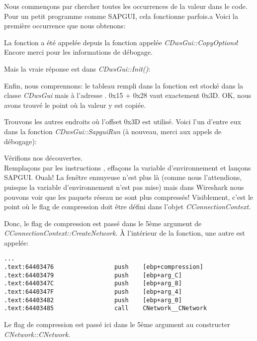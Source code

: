 Nous commençons par chercher toutes les occurrences de la valeur  dans le
code.
Pour un petit programme comme SAPGUI, cela fonctionne parfois.a Voici la première
occurrence que nous obtenons:



La fonction a été appelée depuis la fonction appelée \emph{CDwsGui::CopyOptions}!
Encore merci pour les informations de débogage.

Mais la vraie réponse est dans \emph{CDwsGui::Init()}:



Enfin, nous comprennons: le tableau rempli dans la fonction 
est stocké dans la classe \emph{CDwsGui} mais à l'adresse . 0x15 + 0x28
vaut exactement 0x3D. OK, nous avons trouvé le point où la valeur y est copiée.

Trouvons les autres endroits où l'offset 0x3D est utilisé.
Voici l'un d'entre eux dans la fonction \emph{CDwsGui::SapguiRun} (à nouveau, merci
aux appels de débogage):



Vérifions nos découvertes. \\
Remplaçons  par les instructions ,
effaçons la variable d'environnement \TDWNC et lançons SAPGUI. Ouah! La fenêtre ennuyeuse
n'est plus là (comme nous l'attendions, puisque la variable d'environnement n'est
pas mise) mais dans Wireshark nous pouvons voir que les paquets réseau ne sont plus
compressés!
Visiblement, c'est le point où le flag de compression doit être défini dans l'objet
\emph{CConnectionContext}.

Donc, le flag de compression est passé dans le 5ème argument de \emph{CConnectionContext::CreateNetwork}.
À l'intérieur de la fonction, une autre est appelée:

\begin{lstlisting}[style=customasmx86]
...
.text:64403476                 push    [ebp+compression]
.text:64403479                 push    [ebp+arg_C]
.text:6440347C                 push    [ebp+arg_8]
.text:6440347F                 push    [ebp+arg_4]
.text:64403482                 push    [ebp+arg_0]
.text:64403485                 call    CNetwork__CNetwork
\end{lstlisting}

Le flag de compression est passé ici dans le 5ème argument au constructer \emph{CNetwork::CNetwork}.


